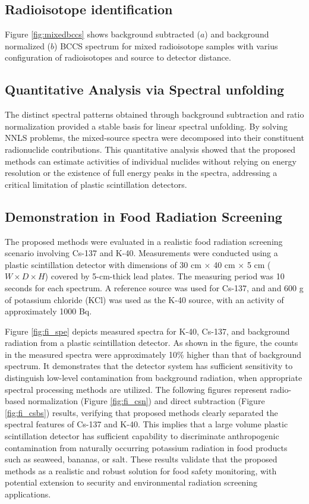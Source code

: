 \documentclass[10pt]{wlscirep}
\begin{document}
\subsection*{Radioisotope identification}

Figure \ref{fig:mixedbccs} shows background subtracted ($a$) and background normalized ($b$) BCCS spectrum for mixed radioisotope samples with varius configuration of radioisotopes and source to detector distance. 


\subsection*{Quantitative Analysis via Spectral unfolding}

The distinct spectral patterns obtained through background subtraction and ratio normalization provided a stable basis for linear spectral unfolding. By solving NNLS problems, the mixed-source spectra were decomposed into their constituent radionuclide contributions. This quantitative analysis showed that the proposed methods can estimate activities of individual nuclides without relying on energy resolution or the existence of full energy peaks in the spectra, addressing a critical limitation of plastic scintillation detectors.

\subsection*{Demonstration in Food Radiation Screening}

The proposed methods were evaluated in a realistic food radiation screening scenario involving Cs-137 and K-40. Measurements were conducted using a plastic scintillation detector with dimensions of 30 cm $\times$ 40 cm $\times$ 5 cm ($W \times D \times H$) covered by 5-cm-thick lead plates. The measuring period was 10 seconds for each spectrum. A reference source was used for Cs-137, and and 600 g of potassium chloride (KCl) was used as the K-40 source, with an activity of approximately 1000 Bq.

Figure \ref{fig:fi_spe} depicts measured spectra for K-40, Cs-137, and background radiation from a plastic scintillation detector. As shown in the figure, the counts in the measured spectra were approximately 10\% higher than that of background spectrum. It demonstrates that the detector system has sufficient sensitivity to distinguish low-level contamination from background radiation, when appropriate spectral processing methods are utilized. The following figures represent radio-based normalization (Figure \ref{fig:fi_csn}) and direct subtraction (Figure \ref{fig:fi_csbs}) results, verifying that proposed methods clearly separated the spectral features of Cs-137 and K-40. This implies that a large volume plastic scintillation detector has sufficient capability to discriminate anthropogenic contamination from naturally occurring potassium radiation in food products such as seaweed, bananas, or salt. These results validate that the proposed methods as a realistic and robust solution for food safety monitoring, with potential extension to security and environmental radiation screening applications.
\end{document}
